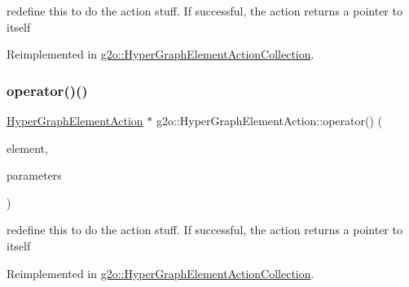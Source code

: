 redefine this to do the action stuff. If successful, the action returns a pointer to itself 



Reimplemented in \mbox{\hyperlink{classg2o_1_1_hyper_graph_element_action_collection_a1388f0d6629501c1b80035f80c56efbe}{g2o\+::\+Hyper\+Graph\+Element\+Action\+Collection}}.

\mbox{\label{classg2o_1_1_hyper_graph_element_action_a0dc2ff77e22791e32810d2c43b7154ad}} 
\subsubsection{\texorpdfstring{operator()()}{operator()()}\hspace{0.1cm}{\footnotesize\ttfamily [2/2]}}
{\footnotesize\ttfamily \mbox{\hyperlink{classg2o_1_1_hyper_graph_element_action}{Hyper\+Graph\+Element\+Action}} $\ast$ g2o\+::\+Hyper\+Graph\+Element\+Action\+::operator() (\begin{DoxyParamCaption}\item[{const \mbox{\hyperlink{structg2o_1_1_hyper_graph_1_1_hyper_graph_element}{Hyper\+Graph\+::\+Hyper\+Graph\+Element}} $\ast$}]{element,  }\item[{\mbox{\hyperlink{structg2o_1_1_hyper_graph_element_action_1_1_parameters}{Hyper\+Graph\+Element\+Action\+::\+Parameters}} $\ast$}]{parameters }\end{DoxyParamCaption})\hspace{0.3cm}{\ttfamily [virtual]}}



redefine this to do the action stuff. If successful, the action returns a pointer to itself 



Reimplemented in \mbox{\hyperlink{classg2o_1_1_hyper_graph_element_action_collection_a4cb9b20a8b1aac8eb018ef6fc4ec0dfc}{g2o\+::\+Hyper\+Graph\+Element\+Action\+Collection}}.

\mbox{\label{classg2o_1_1_hyper_graph_element_action_ae7ed5834d50fb0ff0fef8ec45caaaa3f}} 
